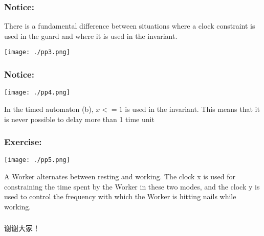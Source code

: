 \documentclass{beamer}
\begin{document}
\begin{frame}
	\frametitle{Notice:}
	There is a fundamental difference between situations where a clock constraint is used in the guard and where it is used in the invariant.
	\begin{center}
		\texttt{[image: ./pp3.png]}
	\end{center}
\end{frame}


\begin{frame}
	\frametitle{Notice:}
	\begin{center}
		\texttt{[image: ./pp4.png]}
	\end{center}
	In the timed automaton (b), $x <= 1$ is used in the invariant. This means that it is never possible to delay more than 1 time unit
\end{frame}


\begin{frame}
	\frametitle{Exercise:}
	\begin{center}
		\texttt{[image: ./pp5.png]}
	\end{center}
	A Worker alternates between resting and working. The clock x is used for constraining the time spent by the Worker in these two modes, and the clock y is used to control the frequency with which the Worker is hitting nails while working. 
\end{frame}



\begin{frame}
	\frametitle{}
	\begin{center}
		谢谢大家！
	\end{center}
\end{frame}

\end{document}
